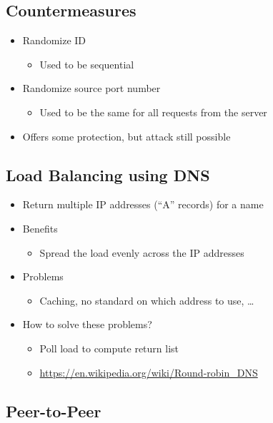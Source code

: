 \subsection{Countermeasures}
\begin{itemize}[nosep]
    \item Randomize ID
          \begin{itemize}[nosep]
              \item Used to be sequential
          \end{itemize}
    \item Randomize source port number
          \begin{itemize}[nosep]
              \item Used to be the same for all requests from the server
          \end{itemize}
    \item Offers some protection, but attack still possible
\end{itemize}
\subsection{Load Balancing using DNS}
\begin{itemize}[nosep]
    \item Return multiple IP addresses (``A'' records) for a name
    \item Benefits
          \begin{itemize}[nosep]
              \item Spread the load evenly across the IP addresses
          \end{itemize}
    \item Problems
          \begin{itemize}[nosep]
              \item Caching, no standard on which address to use, \dots
          \end{itemize}
    \item How to solve these problems?
          \begin{itemize}[nosep]
              \item Poll load to compute return list
              \item \url{https://en.wikipedia.org/wiki/Round-robin_DNS}
          \end{itemize}
\end{itemize}
\subsection{Peer-to-Peer}
